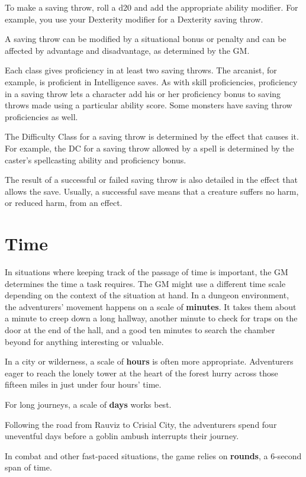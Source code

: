 To make a saving throw, roll a d20 and add the appropriate ability modifier. For example, you use your Dexterity modifier for a Dexterity saving throw.

A saving throw can be modified by a situational bonus or penalty and can be affected by advantage and disadvantage, as determined by the GM.

Each class gives proficiency in at least two saving throws. The arcanist, for example, is proficient in Intelligence saves. As with skill proficiencies, proficiency in a saving throw lets a character add his or her proficiency bonus to saving throws made using a particular ability score. Some monsters have saving throw proficiencies as well.

The Difficulty Class for a saving throw is determined by the effect that causes it. For example, the DC for a saving throw allowed by a spell is determined by the caster's spellcasting ability and proficiency bonus.

The result of a successful or failed saving throw is also detailed in the effect that allows the save. Usually, a successful save means that a creature suffers no harm, or reduced harm, from an effect.

\section{Time}

In situations where keeping track of the passage of time is important, the GM determines the time a task requires. The GM might use a different time scale depending on the context of the situation at hand. In a dungeon environment, the adventurers' movement happens on a scale of \textbf{minutes}. It takes them about a minute to creep down a long hallway, another minute to check for traps on the door at the end of the hall, and a good ten minutes to search the chamber beyond for anything interesting or valuable.

In a city or wilderness, a scale of \textbf{hours} is often more appropriate. Adventurers eager to reach the lonely tower at the heart of the forest hurry across those fifteen miles in just under four hours' time.

For long journeys, a scale of \textbf{days} works best.

Following the road from Rauviz to Crisial City, the adventurers spend four uneventful days before a goblin ambush interrupts their journey.

In combat and other fast-paced situations, the game relies on \textbf{rounds}, a 6-second span of time.

